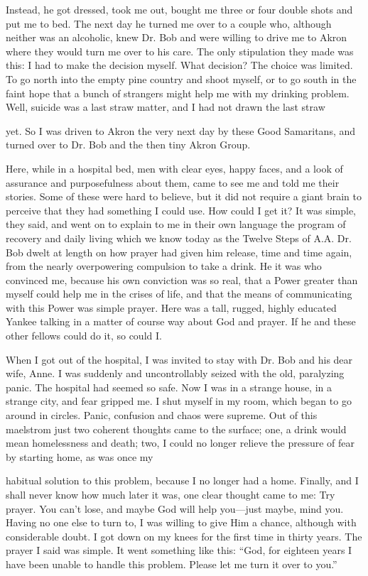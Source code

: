 \begin{biblechapter}
Instead, he got dressed, took me out, bought me three or four double shots and put me to bed. The next day he turned me over to a couple who, although neither was an alcoholic, knew Dr. Bob and were willing to drive me to Akron where they would turn me over to his care. The only stipulation they made was this: I had to make the decision myself. What decision? The choice was limited. To go north into the empty pine country and shoot myself, or to go south in the faint hope that a bunch of strangers might help me with my drinking problem. Well, suicide was a last straw matter, and I had not drawn the last straw

yet. So I was driven to Akron the very next day by these Good Samaritans, and turned over to Dr. Bob and the then tiny Akron Group.

Here, while in a hospital bed, men with clear eyes, happy faces, and a look of assurance and purposefulness about them, came to see me and told me their stories. Some of these were hard to believe, but it did not require a giant brain to perceive that they had something I could use. How could I get it? It was simple, they said, and went on to explain to me in their own language the program of recovery and daily living which we know today as the Twelve Steps of A.A. Dr. Bob dwelt at length on how prayer had given him release, time and time again, from the nearly overpowering compulsion to take a drink. He it was who convinced me, because his own conviction was so real, that a Power greater than myself could help me in the crises of life, and that the means of communicating with this Power was simple prayer. Here was a tall, rugged, highly educated Yankee talking in a matter of course way about God and prayer. If he and these other fellows could do it, so could I.

When I got out of the hospital, I was invited to stay with Dr. Bob and his dear wife, Anne. I was suddenly and uncontrollably seized with the old, paralyzing panic. The hospital had seemed so safe. Now I was in a strange house, in a strange city, and fear gripped me. I shut myself in my room, which began to go around in circles. Panic, confusion and chaos were supreme. Out of this maelstrom just two coherent thoughts came to the surface; one, a drink would mean homelessness and death; two, I could no longer relieve the pressure of fear by starting home, as was once my

habitual solution to this problem, because I no longer had a home. Finally, and I shall never know how much later it was, one clear thought came to me: Try prayer. You can’t lose, and maybe God will help you—just maybe, mind you. Having no one else to turn to, I was willing to give Him a chance, although with considerable doubt. I got down on my knees for the first time in thirty years. The prayer I said was simple. It went something like this: “God, for eighteen years I have been unable to handle this problem. Please let me turn it over to you.”


\end{biblechapter}
